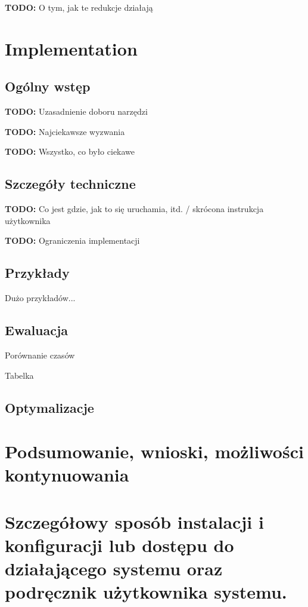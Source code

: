 \documentclass[english,shortabstract,mgr]{iithesis}
\newcommand{\todo}[1]{\textbf{TODO:} #1}
\begin{document}
\todo{O tym, jak te redukcje działają}

\chapter{Implementation}

\section{Ogólny wstęp}

\todo{Uzasadnienie doboru narzędzi}

\todo{Najciekawsze wyzwania}

\todo{Wszystko, co było ciekawe}

\section{Szczegóły techniczne}

\todo{Co jest gdzie, jak to się uruchamia, itd. / skrócona instrukcja użytkownika}

\todo{Ograniczenia implementacji}

\section{Przykłady}

Dużo przykładów...

\section{Ewaluacja}

Porównanie czasów

Tabelka


\cite{sipser2012introduction}
\section{Optymalizacje}

\chapter{Podsumowanie, wnioski, możliwości kontynuowania}

 

%


\appendix

\chapter{Szczegółowy sposób instalacji i konfiguracji lub dostępu do działającego systemu oraz podręcznik użytkownika systemu.}

\end{document}
